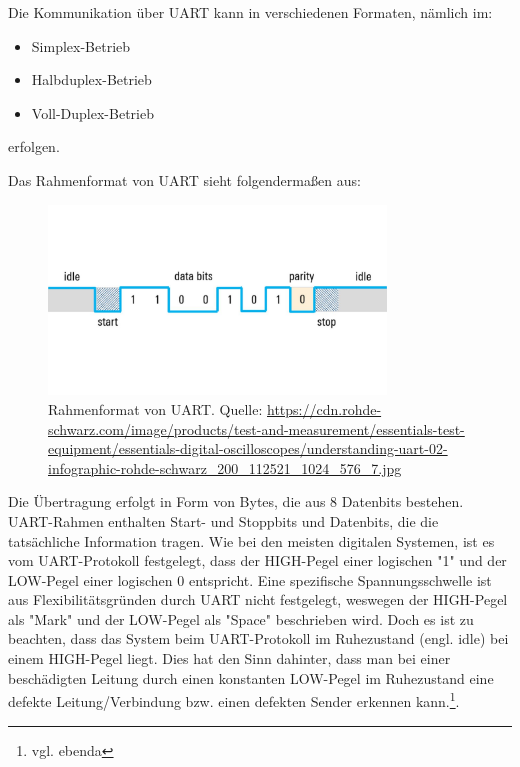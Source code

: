 Die Kommunikation über UART kann in verschiedenen Formaten, nämlich im:
\begin{itemize}
    \item Simplex-Betrieb
    \item Halbduplex-Betrieb
    \item Voll-Duplex-Betrieb
\end{itemize}
erfolgen.

Das Rahmenformat von UART sieht folgendermaßen aus:
\begin{figure}[H]
    \centering
    \includegraphics[width=0.8\textwidth]{Pictures/UART-Frame.jpg}
    \caption{Rahmenformat von UART. Quelle: \url{https://cdn.rohde-schwarz.com/image/products/test-and-measurement/essentials-test-equipment/essentials-digital-oscilloscopes/understanding-uart-02-infographic-rohde-schwarz_200_112521_1024_576_7.jpg}}
    \label{fig:UART-Frame}
\end{figure}

Die Übertragung erfolgt in Form von Bytes, die aus 8 Datenbits bestehen. UART-Rahmen enthalten Start- und Stoppbits und Datenbits, die die tatsächliche Information tragen. Wie bei den meisten digitalen Systemen, ist es vom UART-Protokoll festgelegt, dass der HIGH-Pegel einer logischen "1" und der LOW-Pegel einer logischen 0
entspricht. Eine spezifische Spannungsschwelle ist aus Flexibilitätsgründen durch UART nicht festgelegt, weswegen der HIGH-Pegel als "Mark" und der LOW-Pegel als "Space" beschrieben wird. Doch es ist zu beachten, dass das System beim UART-Protokoll im Ruhezustand (engl. idle) bei einem HIGH-Pegel liegt. Dies hat den Sinn dahinter, dass man bei einer beschädigten Leitung durch
einen konstanten LOW-Pegel im Ruhezustand eine defekte Leitung/Verbindung bzw. einen defekten Sender erkennen kann.\footnote{vgl. ebenda}.

